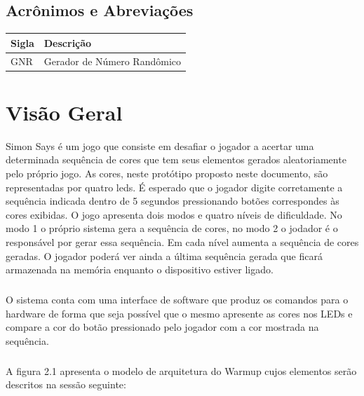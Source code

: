 \documentclass{report}
\begin{document}
  \section{Acrônimos e Abreviações}
    \FloatBarrier
    \begin{table}[H]
      \begin{center}
        \begin{tabular}[pos]{|m{2cm} | m{12cm}|} 
          \hline
          \cellcolor[gray]{0.9}\textbf{Sigla} & \cellcolor[gray]{0.9}\textbf{Descrição} \\ \hline
            GNR & Gerador de Número Randômico \\ \hline
        \end{tabular}
      \end{center}
    \end{table}  

\chapter{Visão Geral}

    Simon Says é um jogo que consiste em desafiar o jogador a acertar uma determinada sequência de cores que tem seus elementos gerados aleatoriamente pelo próprio jogo. As cores, neste protótipo proposto neste documento, são representadas por quatro leds. É esperado que o jogador digite corretamente a sequência indicada dentro de 5 segundos pressionando botões correspondes às cores exibidas. O jogo apresenta dois modos e quatro níveis de dificuldade.
    No modo 1 o próprio sistema gera a sequência de cores, no modo 2 o jodador é o responsável por gerar essa sequência. Em cada nível aumenta a sequência de cores geradas. O jogador poderá ver ainda a última sequência gerada que ficará armazenada na memória enquanto o dispositivo estiver ligado.
\paragraph{}
    O sistema conta com uma interface de software que produz os comandos para o hardware de forma que seja possível que o mesmo apresente as cores nos LEDs e compare a cor do botão pressionado pelo jogador com a cor mostrada na sequência.
\paragraph{}
    A figura 2.1 apresenta o modelo de arquitetura do Warmup cujos elementos serão descritos na sessão seguinte:
\end{document}
